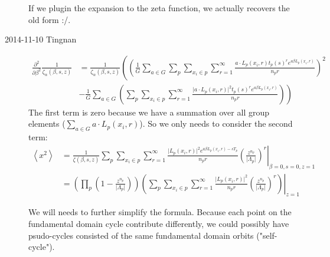 \begin{description}
If we plugin the expansion to the zeta function, we actually recovers
the old form :/.

\item[2014-11-10 Tingnan] 



\begin{align*}
\frac{\partial^{2}}{\partial\beta^{2}}\frac{1}{\zeta_{\alpha}(\beta,s,z)} & =\frac{1}{\zeta_{\alpha}(\beta,s,z)}\left(\left(\frac{1}{G}\sum_{a\in G}\sum_{p}\sum_{x_{i}\in p}\sum_{r=1}^{\infty}\frac{a\cdot L_{p}(x_{i},r)t_{p}(s)^{r}e^{a\beta L_{p}(x_{i},r)}}{n_{p}r}\right)^{2}\right.\\
 & \left.-\frac{1}{G}\sum_{a\in G}\left(\sum_{p}\sum_{x_{i}\in p}\sum_{r=1}^{\infty}\frac{\vert a\cdot L_{p}(x_{i},r)\vert^{2}t_{p}(s)^{r}e^{a\beta L_{p}(x_{i},r)}}{n_{p}r}\right)\right)
\end{align*}
The first term is zero because we have a summation over all group elements ($\sum_{a\in G} a\cdot L_p(x_i,r)$). 
So we only needs to consider the second term:
\begin{align*}
\left\langle x^{2}\right\rangle  & =\left.\frac{1}{\zeta(\beta,s,z)}\sum_{p}\sum_{x_{i}\in p}\sum_{r=1}^{\infty}\frac{\vert L_{p}(x_{i},r)\vert^{2}e^{a\beta L_{p}(x_{i},r)-sT_{p}}}{n_{p}r}\left(\frac{z^{n_{p}}}{\vert\Lambda_{p}\vert}\right)^{r}\right|_{\beta=0,s=0,z=1}\\
 & =\left.\left(\prod_{p}\left(1-\frac{z^{n_{p}}}{\vert\Lambda_{p}\vert}\right)\right)\left(\sum_{p}\sum_{x_{i}\in p}\sum_{r=1}^{\infty}\frac{\vert L_{p}(x_{i},r)\vert^{2}}{n_{p}r}\left(\frac{z^{n_{p}}}{\vert\Lambda_{p}\vert}\right)^{r}\right)\right|_{z=1}
\end{align*}


We will needs to further simplify the formula. Because each point on the fundamental domain cycle contribute differently, we could possibly have psudo-cycles consisted of the same fundamental domain orbits ("self-cycle"). 

\end{description}
